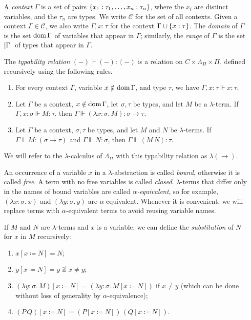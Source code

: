 A \emph{context} \( \Gamma \) is a set of pairs \( \qty{x_1 : \tau_1, \dots, x_n : \tau_n} \), where the \( x_i \) are distinct variables, and the \( \tau_n \) are types.
We write \( \mathcal C \) for the set of all contexts.
Given a context \( \Gamma \in \mathcal C \), we also write \( \Gamma, x : \tau \) for the context \( \Gamma \cup \qty{x : \tau} \).
The \emph{domain} of \( \Gamma \) is the set \( \operatorname{dom} \Gamma \) of variables that appear in \( \Gamma \); similarly, the \emph{range} of \( \Gamma \) is the set \( \abs{\Gamma} \) of types that appear in \( \Gamma \).

The \emph{typability relation} \( (-) \Vdash (-) : (-) \) is a relation on \( C \times \Lambda_\Pi \times \Pi \), defined recursively using the following rules.
\begin{enumerate}
    \item For every context \( \Gamma \), variable \( x \notin \operatorname{dom} \Gamma \), and type \( \tau \), we have \( \Gamma, x : \tau \Vdash x : \tau \).
    \item Let \( \Gamma \) be a context, \( x \notin \operatorname{dom} \Gamma \), let \( \sigma, \tau \) be types, and let \( M \) be a \( \lambda \)-term.
    If \( \Gamma, x : \sigma \Vdash M : \tau \), then \( \Gamma \Vdash (\lambda x : \sigma.\, M) : \sigma \to \tau \).
    \item Let \( \Gamma \) be a context, \( \sigma, \tau \) be types, and let \( M \) and \( N \) be \( \lambda \)-terms.
    If \( \Gamma \Vdash M : (\sigma \to \tau) \) and \( \Gamma \Vdash N : \sigma \), then \( \Gamma \Vdash (M\, N) : \tau \).
\end{enumerate}
We will refer to the \( \lambda \)-calculus of \( \Lambda_\Pi \) with this typability relation as \( \lambda(\to) \).

An occurrence of a variable \( x \) in a \( \lambda \)-abstraction is called \emph{bound}, otherwise it is called \emph{free}.
A term with no free variables is called \emph{closed}.
\( \lambda \)-terms that differ only in the names of bound variables are called \emph{\( \alpha \)-equivalent}, so for example, \( (\lambda x:\sigma.\, x) \) and \( (\lambda y:\sigma.\, y) \) are \( \alpha \)-equivalent.
Whenever it is convenient, we will replace terms with \( \alpha \)-equivalent terms to avoid reusing variable names.

If \( M \) and \( N \) are \( \lambda \)-terms and \( x \) is a variable, we can define the \emph{substitution} of \( N \) for \( x \) in \( M \) recursively:
\begin{enumerate}
    \item \( x[x \coloneq N] = N \);
    \item \( y[x \coloneq N] = y \) if \( x \neq y \);
    \item \( (\lambda y : \sigma.\, M)[x \coloneq N] = (\lambda y:\sigma.\, M[x \coloneq N]) \) if \( x \neq y \) (which can be done without loss of generality by \( \alpha \)-equivalence);
    \item \( (P\, Q)[x \coloneq N] = (P[x \coloneq N])\, (Q[x \coloneq N]) \).
\end{enumerate}

